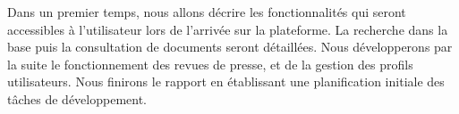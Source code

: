     Dans un premier temps, nous allons décrire les fonctionnalités qui seront accessibles à l'utilisateur lors de l'arrivée sur la plateforme. La recherche dans la base puis la consultation de documents seront détaillées. Nous développerons par la suite le fonctionnement des revues de presse, et de la gestion des profils utilisateurs. Nous finirons le rapport en établissant une planification initiale des tâches de développement.